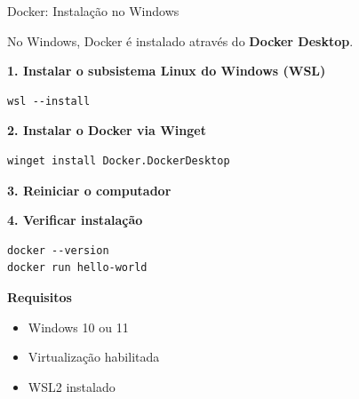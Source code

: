 \documentclass{beamer}
\begin{document}
\begin{frame}[fragile]{Docker: Instalação no Windows}
    
    No Windows, Docker é instalado através do \textbf{Docker Desktop}.
    
    \vspace{0.3cm}
    \textbf{1. Instalar o subsistema Linux do Windows (WSL)}
    \begin{verbatim}
wsl --install
    \end{verbatim}   
    
    \textbf{2. Instalar o Docker via Winget}
    
    \begin{verbatim}
winget install Docker.DockerDesktop
    \end{verbatim}
    
    \textbf{3. Reiniciar o computador}
    
    \textbf{4. Verificar instalação}
    
    \begin{verbatim}
docker --version
docker run hello-world
    \end{verbatim}
    
    \textbf{Requisitos}
    
    \begin{itemize}
        \item Windows 10 ou 11
        \item Virtualização habilitada
        \item WSL2 instalado
    \end{itemize}
    
\end{frame}
\end{document}
